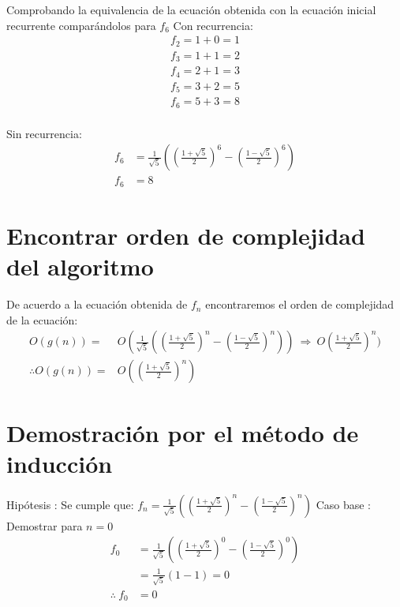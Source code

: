 \documentclass[letterpaper,11pt, fleqn]{article}
\begin{document}
Comprobando la equivalencia de la ecuación obtenida con la ecuación inicial recurrente comparándolos para $f_{6}$ \smallbreak
Con recurrencia:
\begin{equation*}
\begin{aligned}
	f_{2} = 1 + 0 = 1 \\
	f_{3} = 1 + 1 = 2 \\
	f_{4} = 2 + 1 = 3 \\
	f_{5} = 3 + 2 = 5 \\
	f_{6} = 5 + 3 = 8 \\
\end{aligned}
\end{equation*}

Sin recurrencia:
\begin{equation*}
\begin{aligned}
	f_{6} &= \frac{1}{\sqrt{5}} ((\frac{1 + \sqrt{5}}{2})^{6} - (\frac{1 - \sqrt{5}}{2})^{6}) \\
	f_{6} &= 8
\end{aligned}
\end{equation*}
\newpage

\section{Encontrar orden de complejidad del algoritmo}
De acuerdo a la ecuación obtenida de $f_{n}$ encontraremos el orden de complejidad de la ecuación:
\begin{equation*}
\begin{aligned}
	O(g(n)) =& O(\frac{1}{\sqrt{5}} ((\frac{1 + \sqrt{5}}{2})^{n} - (\frac{1 - \sqrt{5}}{2})^{n})) \ \Rightarrow \ O(\frac{1 + \sqrt{5}}{2})^{n}) \\
	\therefore O(g(n)) =& O((\frac{1 + \sqrt{5}}{2})^{n})
\end{aligned}
\end{equation*}

\section{Demostración por el método de inducción}
Hipótesis : Se cumple que: $ f_{n} = \frac{1}{\sqrt{5}} ((\frac{1 + \sqrt{5}}{2})^{n} - (\frac{1 - \sqrt{5}}{2})^{n}) $ \smallbreak
Caso base : Demostrar para $ n = 0$
\begin{equation*}
\begin{aligned}
	f_{0} &= \frac{1}{\sqrt{5}} ((\frac{1 + \sqrt{5}}{2})^{0} - (\frac{1 - \sqrt{5}}{2})^{0}) \\
	&= \frac{1}{\sqrt{5}} (1 - 1) = 0 \\
	\therefore \ f_{0} &= 0
\end{aligned}
\end{equation*}
\end{document}
